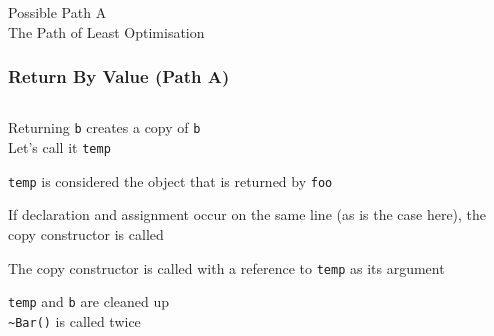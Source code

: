 \begin{frame}
  \begin{center} \Huge
    Possible Path A \\[4mm]
    The Path of Least Optimisation
  \end{center}
\end{frame}

\begin{frame}
  \frametitle{Return By Value (Path A)}
  \begin{center}
    \begin{columns}
      \column{4cm}
      \column{4cm}
    \end{columns}
  \end{center}
  \vskip2mm
  \begin{overprint}
    \begin{center}
      Returning {\tt b} creates a copy of {\tt b} \\
      Let's call it {\tt temp} \\
    \end{center}

    \begin{center}
      {\tt temp} is considered the object that is returned by {\tt foo}
    \end{center}

    \begin{center}
      If declaration and assignment occur on the same line (as is the case here),
      the copy constructor is called
    \end{center}

    \begin{center}
      The copy constructor is called with a reference to {\tt temp} as its argument
    \end{center}

    \begin{center}
      {\tt temp} and {\tt b} are cleaned up \\
      {\tt \~{}Bar()} is called twice
    \end{center}
  \end{overprint}
\end{frame}

